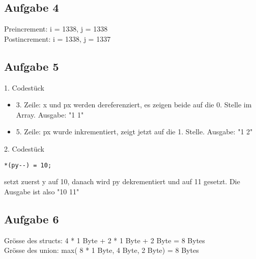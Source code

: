 \documentclass[a4paper,abstracton]{scrartcl}
\begin{document}
\subsection{Aufgabe 4}
Preincrement: i = 1338, j = 1338 \\
Postincrement: i = 1338, j = 1337

\subsection{Aufgabe 5}
1. Codestück
\begin{itemize}
	\item 3. Zeile: x und px werden dereferenziert, es zeigen beide auf die 0. Stelle im Array. Ausgabe: "1 1"
	\item 5. Zeile: px wurde inkrementiert, zeigt jetzt auf die 1. Stelle. Ausgabe: "1 2"
\end{itemize}


2. Codestück
\begin{verbatim}
*(py--) = 10;
\end{verbatim} setzt zuerst y auf 10, danach wird py dekrementiert und auf 11 gesetzt. Die Ausgabe ist also "10 11"

\subsection{Aufgabe 6}
Grösse des structs: 4 * 1 Byte + 2 * 1 Byte + 2 Byte = 8 Bytes \\
Grösse des union: max( 8 * 1 Byte, 4 Byte, 2 Byte) = 8 Bytes
\end{document}
